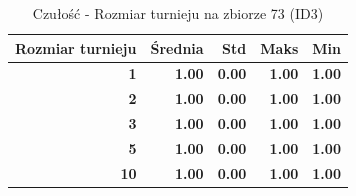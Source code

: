 \begin{table}[htbp]
\centering
\small
\setlength{\tabcolsep}{6pt}
\renewcommand{\arraystretch}{1.2}
\caption{Czułość - Rozmiar turnieju na zbiorze 73 (ID3)}
\label{tab:ID3_tournament_size_73_recall}
\begin{tabular}{r|r|r|r|r}
\toprule
Rozmiar turnieju & Średnia & Std & Maks & Min \\
\hline
\textbf{1} & \textbf{1.00} & \textbf{0.00} & \textbf{1.00} & \textbf{1.00} \\
\textbf{2} & \textbf{1.00} & \textbf{0.00} & \textbf{1.00} & \textbf{1.00} \\
\textbf{3} & \textbf{1.00} & \textbf{0.00} & \textbf{1.00} & \textbf{1.00} \\
\textbf{5} & \textbf{1.00} & \textbf{0.00} & \textbf{1.00} & \textbf{1.00} \\
\textbf{10} & \textbf{1.00} & \textbf{0.00} & \textbf{1.00} & \textbf{1.00} \\
\bottomrule
\end{tabular}
\end{table}